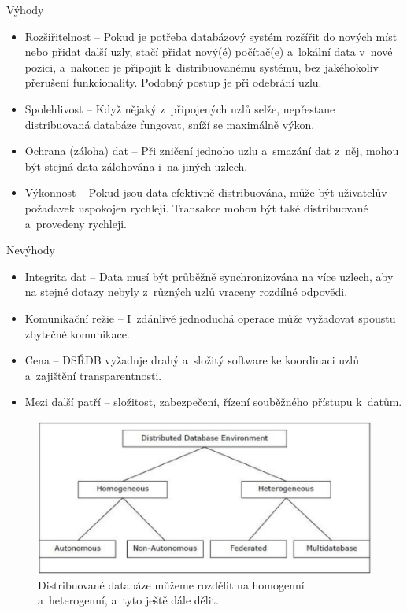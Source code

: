 \noindent Výhody
\begin{itemize}
\item Rozšiřitelnost – Pokud je potřeba databázový systém rozšířit do nových míst nebo přidat další uzly, stačí přidat nový(é) počítač(e) a~lokální data v~nové pozici, a~nakonec je připojit k~distribuovanému systému, bez jakéhokoliv přerušení funkcionality. Podobný postup je při odebrání uzlu.

\item Spolehlivost – Když nějaký z~připojených uzlů selže, nepřestane distribuovaná databáze fungovat, sníží se maximálně výkon.

\item Ochrana (záloha) dat – Při zničení jednoho uzlu a~smazání dat z~něj, mohou být stejná data zálohována i~na jiných uzlech.

\item Výkonnost – Pokud jsou data efektivně distribuována, může být uživatelův požadavek uspokojen rychleji. Transakce mohou být také distribuované a~provedeny rychleji. 
\end{itemize}

\noindent Nevýhody
\begin{itemize}
\item Integrita dat – Data musí být průběžně synchronizována na více uzlech, aby na stejné dotazy nebyly z~různých uzlů vraceny rozdílné odpovědi.

\item Komunikační režie – I~zdánlivě jednoduchá operace může vyžadovat spoustu zbytečné komunikace.

\item Cena – DSŘDB vyžaduje drahý a~složitý software ke koordinaci uzlů a~zajištění transparentnosti. \cite{distributedDBMS}

\item Mezi další patří – složitost, zabezpečení, řízení souběžného přístupu k~datům.
\end{itemize}

\begin{figure}[!h]
  \centering
  \includegraphics[width=15cm]{template-fig/distributed_database_environments.pdf}
  \caption{Distribuované databáze můžeme rozdělit na homogenní a~heterogenní, a~tyto ještě dále dělit. \cite{distributedDBMS}}
  \label{FIG_DivDistrDB}
\end{figure}

